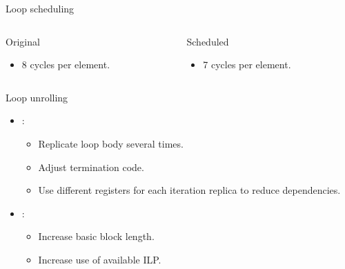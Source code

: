 \begin{frame}[t]{Loop scheduling}

\begin{columns}[T]

\begin{column}{.45\textwidth}
\begin{block}{Original}

\end{block}

\begin{itemize}
  \item 8 cycles per element.
\end{itemize}
\end{column}

\pause
\begin{column}{.45\textwidth}
\begin{block}{Scheduled}

\end{block}
\begin{itemize}
  \item 7 cycles per element.
\end{itemize}
\end{column}

\end{columns}
\end{frame}

\begin{frame}[t]{Loop unrolling}
\begin{itemize}
  \item {}:
    \begin{itemize}
      \item Replicate loop body several times.
      \item Adjust termination code.
      \item Use different registers for each iteration replica to reduce dependencies.
    \end{itemize}

  \item {}:
    \begin{itemize}
      \item Increase basic block length.
      \item Increase use of available ILP.
    \end{itemize}
\end{itemize}
\end{frame}

